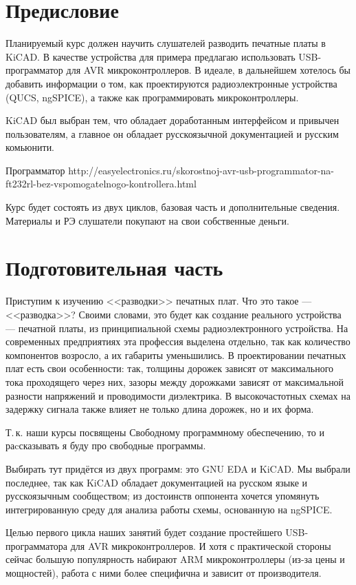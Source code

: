 \section{Предисловие}\label{kicad:introduction:pre}
Планируемый курс должен научить слушателей разводить печатные платы в KiCAD. В качестве устройства для примера предлагаю использовать USB-программатор для AVR микроконтроллеров. В идеале, в дальнейшем хотелось бы добавить информации о том, как проектируются радиоэлектронные устройства (QUCS, ngSPICE), а также как программировать микроконтроллеры.

KiCAD был выбран тем, что обладает доработанным интерфейсом и привычен пользователям, а главное он обладает русскоязычной документацией и русским комьюнити.

Программатор http://easyelectronics.ru/skorostnoj-avr-usb-pro\-gram\-ma\-tor-na-ft232rl-bez-vspomogatelnogo-kontrollera.html

Курс будет состоять из двух циклов, базовая часть и дополнительные сведения. Материалы и РЭ слушатели покупают на свои собственные деньги. 

\section{Подготовительная часть} 
Приступим к изучению <<разводки>> печатных плат. Что это такое --- <<разводка>>? Своими словами, это будет как создание реального устройства --- печатной платы, из принципиальной схемы радиоэлектронного устройства. 
На современных предприятиях эта профессия выделена отдельно, так как количество компонентов возросло, а их габариты уменьшились.
В проектировании печатных плат есть свои особенности: так, толщины дорожек зависят от максимального тока проходящего через них, зазоры между дорожками зависят от максимальной разности напряжений и проводимости диэлектрика. В высокочастотных схемах на задержку сигнала также влияет не только длина дорожек, но и их форма.

Т.\,к. наши курсы посвящены Свободному программному обеспечению, то и раcсказывать я буду про свободные программы.

Выбирать тут придётся из двух программ: это GNU EDA и KiCAD. Мы выбрали последнее, так как KiCAD  обладает документацией на русском языке и русскоязычным сообществом; из достоинств оппонента хочется упомянуть интегрированную среду для анализа работы схемы, основанную на ngSPICE. 

Целью первого цикла наших занятий будет создание простейшего USB-программатора для AVR микроконтроллеров. И хотя с практической стороны сейчас большую популярность набирают ARM микроконтроллеры (из-за цены и мощностей), работа с ними более специфична и зависит от производителя.

